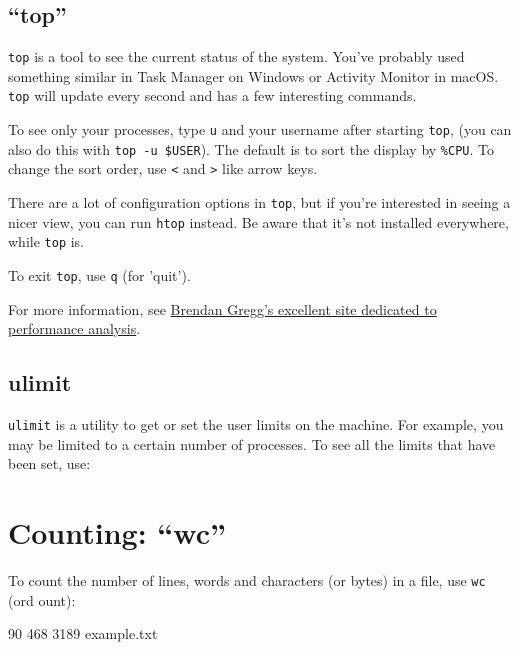 \begin{prompt}
\end{prompt}

\subsection{``top''}
\verb|top| is a tool to see the current status of the system. You've probably used
something similar in Task Manager on Windows or Activity Monitor in macOS. \verb|top|
will update every second and has a few interesting commands.

To see only your processes, type \verb|u| and your username after starting \verb|top|, (you can also do
this with \verb|top -u $USER|). The default is to sort the display by \verb|%CPU|.
To change the sort order, use \verb|<| and \verb|>| like arrow keys.

There are a lot of configuration options in \verb|top|, but if you're interested in
seeing a nicer view, you can run \verb|htop| instead. Be aware that it's not
installed everywhere, while \verb|top| is.

To exit \verb|top|, use \verb|q| (for 'quit').

For more information, see \href{http://brendangregg.com}{Brendan Gregg's excellent
site dedicated to performance analysis}.

\subsection{ulimit}
\verb|ulimit| is a utility to get or set the user limits on the machine. For
example, you may be limited to a certain number of processes. To see all the
limits that have been set, use:

\begin{prompt}
\end{prompt}

\section{Counting: ``wc''}

To count the number of lines, words and characters (or bytes) in a file, use \verb|wc| (ord ount):

\begin{prompt}
      90     468    3189  example.txt
\end{prompt}

